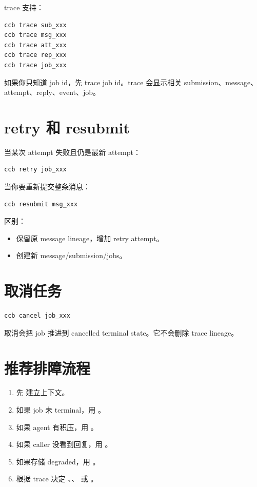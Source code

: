 trace 支持：

\begin{lstlisting}
ccb trace sub_xxx
ccb trace msg_xxx
ccb trace att_xxx
ccb trace rep_xxx
ccb trace job_xxx
\end{lstlisting}

如果你只知道 job id，先 trace job id。trace 会显示相关 submission、message、attempt、reply、event、job。

\section{retry 和 resubmit}

当某次 attempt 失败且仍是最新 attempt：

\begin{lstlisting}
ccb retry job_xxx
\end{lstlisting}

当你要重新提交整条消息：

\begin{lstlisting}
ccb resubmit msg_xxx
\end{lstlisting}

区别：

\begin{itemize}
  \item {} 保留原 message lineage，增加 retry attempt。
  \item {} 创建新 message/submission/jobs。
\end{itemize}

\section{取消任务}

\begin{lstlisting}
ccb cancel job_xxx
\end{lstlisting}

取消会把 job 推进到 cancelled terminal state。它不会删除 trace lineage。

\section{推荐排障流程}

\begin{enumerate}
  \item 先  建立上下文。
  \item 如果 job 未 terminal，用 。
  \item 如果 agent 有积压，用 。
  \item 如果 caller 没看到回复，用 。
  \item 如果存储 degraded，用 。
  \item 根据 trace 决定 、、 或 。
\end{enumerate}
